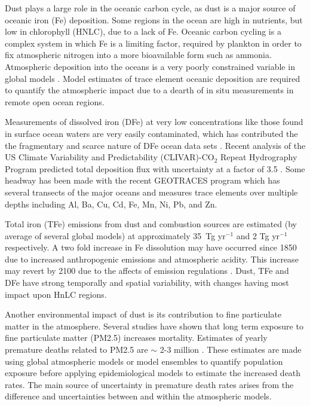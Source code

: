   Dust plays a large role in the oceanic carbon cycle, as dust is a major source of oceanic iron (Fe) deposition.
  Some regions in the ocean are high in nutrients, but low in chlorophyll (HNLC), due to a lack of Fe.
  Oceanic carbon cycling is a complex system in which Fe is a limiting factor, required by plankton in order to fix atmospheric nitrogen into a more bioavailable form such as ammonia.
  Atmospheric deposition into the oceans is a very poorly constrained variable in global models \citep{Grand2015}.
  Model estimates of trace element oceanic deposition are required to quantify the atmospheric impact due to a dearth of in situ measurements in remote open ocean regions.

  Measurements of dissolved iron (DFe) at very low concentrations like those found in surface ocean waters are very easily contaminated, which has contributed the the fragmentary and scarce nature of DFe ocean data sets \citep{Rijkenberg_2014}.
  Recent analysis of the US Climate Variability and Predictability (CLIVAR)-CO$_{2}$ Repeat Hydrography Program predicted total deposition flux with uncertainty at a factor of 3.5 \citep{Grand2015}.
  Some headway has been made with the recent GEOTRACES program which has several transects of the major oceans and measures trace elements over multiple depths including Al, Ba, Cu, Cd, Fe, Mn, Ni, Pb, and Zn.
    
  Total iron (TFe) emissions from dust and combustion sources are estimated (by average of several global models) at approximately 35~Tg yr$^{-1}$ and 2 Tg yr$^{-1}$ respectively. A two fold increase in Fe dissolution may have occurred since 1850 due to increased anthropogenic emissions and atmospheric acidity.
  This increase may revert by 2100 due to the affects of emission regulations \citep{Myriokefalitakis_2015}.
  Dust, TFe and DFe have strong temporally and spatial variability, with changes having most impact upon HnLC regions.

  Another environmental impact of dust is its contribution to fine particulate matter in the atmosphere.
  Several studies have shown that long term exposure to fine particulate matter (PM2.5) increases mortality. 
  Estimates of yearly premature deaths related to PM2.5 are $\sim$ 2-3 million \citep{Hoek_2013, Krewski_2009, Silva_2013, Lelieveld_2015}.   
  These estimates are made using global atmospheric models or model ensembles to quantify population exposure before applying epidemiological models to estimate the increased death rates.
  The main source of uncertainty in premature death rates arises from the difference and uncertainties between and within the atmospheric models.

